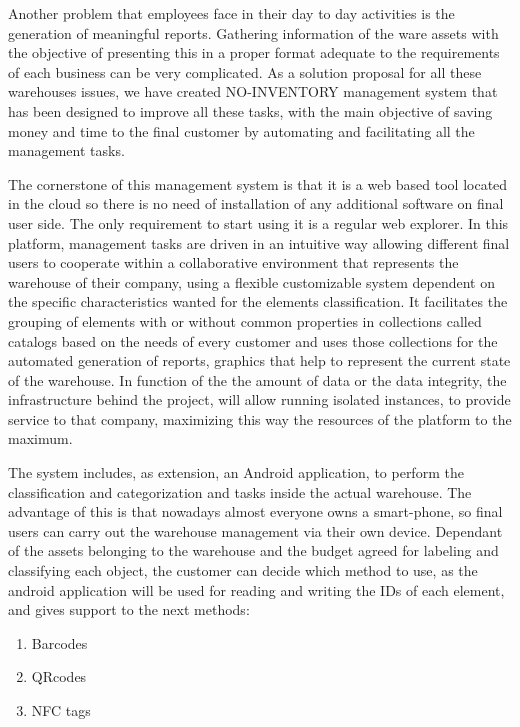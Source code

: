 Another problem that employees face in their day to day activities is the generation of meaningful reports. Gathering information of the ware assets with the objective of presenting this in a proper format adequate to the requirements of each business can be very complicated. As a solution proposal for all these warehouses issues, we have created NO-INVENTORY management system that has been designed to improve all these tasks, with the main objective of saving money and time to the final customer by automating and facilitating all the management tasks.

The cornerstone of this management system is that it is a web based tool located in the cloud so there is no need of installation of any additional software on final user side. The only requirement to start using it is a regular web explorer. In this platform, management tasks are driven in an intuitive way allowing different final users to cooperate within a collaborative environment that represents the warehouse of their company, using a flexible customizable system dependent on the specific characteristics wanted for the elements classification. It facilitates the grouping of elements with or without common properties in collections called catalogs based on the needs of every customer and uses those collections for the automated generation of reports, graphics that help to represent the current state of the warehouse. In function of the the amount of data or the data integrity, the infrastructure behind the project, will allow running isolated instances, to provide service to that company, maximizing this way the resources of the platform to the maximum.


The system includes, as extension, an Android application, to perform the classification and categorization and tasks inside the actual warehouse. The advantage of this is that nowadays almost everyone owns a smart-phone, so final users can carry out the warehouse management via their own device. Dependant of the assets belonging to the warehouse and the budget agreed for labeling and classifying each object, the customer can decide which method to use, as the android application will be used for reading and writing the IDs of each element, and gives support to the next methods:


\begin{enumerate}
\item Barcodes
\item QRcodes
\item NFC tags
\end{enumerate}

